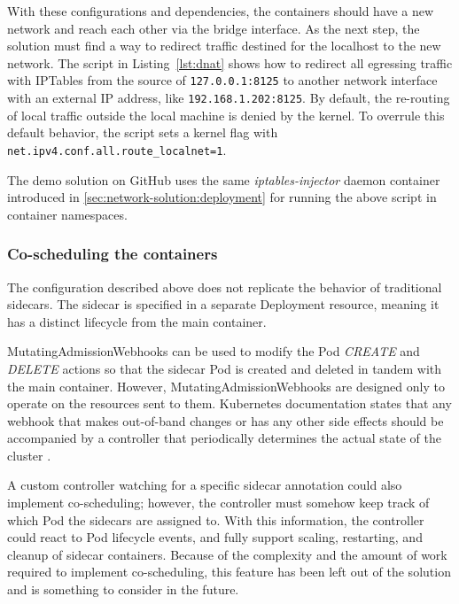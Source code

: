 \documentclass[english, 12pt, a4paper, sci, utf8, a-2b, online]{aaltothesis}
\begin{document}
With these configurations and dependencies, the containers should have a new network and reach each other via the bridge interface.
As the next step, the solution must find a way to redirect traffic destined for the localhost to the new network.
The script in Listing~\ref{lst:dnat} shows how to redirect all egressing traffic with IPTables from the source of \lstinline{127.0.0.1:8125} to another network interface with an external IP address, like \lstinline{192.168.1.202:8125}.
By default, the re-routing of local traffic outside the local machine is denied by the kernel.
To overrule this default behavior, the script sets a kernel flag with \lstinline{net.ipv4.conf.all.route_localnet=1}.



The demo solution on GitHub uses the same \emph{iptables-injector} daemon container introduced in \ref{sec:network-solution:deployment} for running the above script in container namespaces.

\subsubsection{Co-scheduling the containers}

The configuration described above does not replicate the behavior of traditional sidecars.
The sidecar is specified in a separate Deployment resource, meaning it has a distinct lifecycle from the main container.

MutatingAdmissionWebhooks can be used to modify the Pod \emph{CREATE} and \emph{DELETE} actions so that the sidecar Pod is created and deleted in tandem with the main container.
However, MutatingAdmissionWebhooks are designed only to operate on the resources sent to them.
Kubernetes documentation states that any webhook that makes out-of-band changes or has any other side effects should be accompanied by a controller that periodically determines the actual state of the cluster \cite{k8s-docs-dac}.

A custom controller watching for a specific sidecar annotation could also implement co-scheduling; however, the controller must somehow keep track of which Pod the sidecars are assigned to.
With this information, the controller could react to Pod lifecycle events, and fully support scaling, restarting, and cleanup of sidecar containers.
Because of the complexity and the amount of work required to implement co-scheduling, this feature has been left out of the solution and is something to consider in the future.
\end{document}
